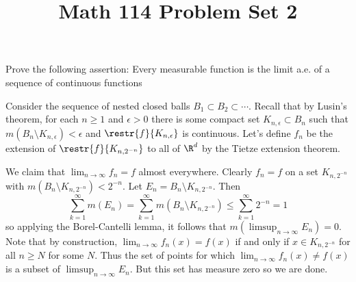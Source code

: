 \documentclass[11pt,letterpaper]{article}
\title{\textbf{Math 114 Problem Set 2}}
\begin{document}
\maketitle

\begin{cproblem}{18}
    Prove the following assertion: Every measurable function is the limit a.e. of a
sequence of continuous functions
\end{cproblem}

\begin{solution}
    Consider the sequence of nested closed balls $B_1\subset B_2\subset \cdots$. Recall that by Lusin's theorem, for each $n\geq 1$ and $\epsilon >0$ there is some compact set $K_{n,\epsilon}\subset B_n$ such that $m(B_n\setminus K_{n,\epsilon})<\epsilon$ and $\restr{f}{K_{n,\epsilon}}$ is continuous. Let's define $f_n$ be the extension of $\restr{f}{K_{n,2^{-n}}}$ to all of $\R^d$ by the Tietze extension theorem.

    We claim that $\lim_{n\to \infty} f_n = f$ almost everywhere. Clearly $f_n = f$ on a set $K_{n,2^{-n}}$ with $m(B_n\setminus K_{n,2^{-n}})<2^{-n}$. Let $E_n = B_n\setminus K_{n,2^{-n}}$. Then
    \[
        \sum^\infty_{k=1} m(E_n) = \sum^\infty_{k=1} m(B_n\setminus K_{n,2^{-n}}) \leq \sum^\infty_{k=1}2^{-n}=1
    \]
    so applying the Borel-Cantelli lemma, it follows that $m\left(\limsup_{n\to\infty} E_n\right)=0$. Note that by construction, $\lim_{n\to\infty} f_n(x)=f(x)$ if and only if $x\in K_{n, 2^{-n}}$ for all $n\geq N$ for some $N$. Thus the set of points for which $\lim_{n\to \infty} f_n(x)\neq f(x)$ is a subset of $\limsup_{n\to\infty} E_n$. But this set has measure zero so we are done.




\end{solution}
\end{document}

